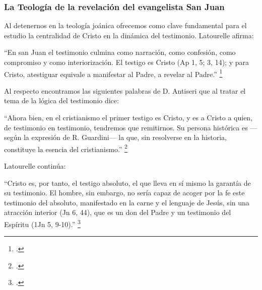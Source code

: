 \documentclass[12pt]{article}
\begin{document}
{\subsubsection{La Teología de la revelación del evangelista San Juan}

Al detenernos en la teología joánica ofrecemos como clave fundamental para el estudio la centralidad de Cristo en la dinámica del testimonio. Latourelle afirma:

``En san Juan el testimonio culmina como narración, como confesión, como compromiso y como interiorización. El testigo es Cristo (Ap 1, 5; 3, 14); y para Cristo, atestiguar equivale a manifestar al Padre, a revelar al Padre.''
\footcite[p.~1529]{dicctf}

Al respecto encontramos las siguientes palabras de D. Antiseri que al tratar el tema de la lógica del testimonio dice:

``Ahora bien, en el cristianismo el primer testigo es Cristo, y es a Cristo a quien, de testimonio en testimonio, tendremos que remitirnos. Su persona histórica es ---según la expresión de R. Guardini--- la que, sin resolverse en la historia, constituye la esencia del cristianismo.''
\footcite[p.~168]{antiseri}

Latourelle continúa:

``Cristo es, por tanto, el testigo absoluto, el que lleva en sí mismo la garantía de su testimonio. El hombre, sin embargo, no sería capaz de acoger por la fe este testimonio del absoluto, manifestado en la carne y el lenguaje de Jesús, sin una atracción interior (Jn 6, 44), que es un don del Padre y un testimonio del Espíritu (1Jn 5, 9-10).''
\footcite[p.~1530]{dicctf}

}
\end{document}

